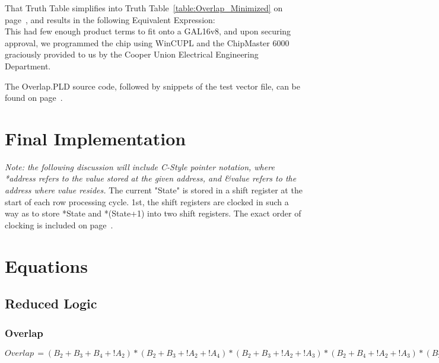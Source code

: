 \documentclass[letterpaper,titlepage,oneside]{article}
\begin{document}
That Truth Table simplifies into Truth Table~\ref{table:Overlap_Minimized} on page~\pageref{table:Overlap_Minimized}, and results in the following Equivalent Expression:\\[5pt]

This had few enough product terms to fit onto a GAL16v8, and upon securing approval, we programmed the chip using WinCUPL and the ChipMaster 6000 graciously provided to us by the Cooper Union Electrical Engineering Department.

The Overlap.PLD source code, followed by snippets of the test vector file, can be found on page~\pageref{code:Overlap}.

\clearpage

\section{Final Implementation}
\textit{Note: the following discussion will include C-Style pointer notation, where *address refers to the value stored at the given address, and \&value refers to the address where value resides.}
The current "State" is stored in a shift register at the start of each row processing cycle. 1st, the shift registers are clocked in such a way as to store *State and *(State+1) into two shift registers. The exact order of clocking is included on page~\pageref{table:Clock}.

\section{Equations}
\subsection{Reduced Logic}
\subsubsection{Overlap}
\begin{normalsize}
$Overlap\,=(B_{2}+B_{3}+B_{4}+!A_{2})*(B_{2}+B_{3}+!A_{2}+!A_{4})*(B_{2}+B_{3}+!A_{2}+!A_{3})*(B_{2}+B_{4}+!A_{2}+!A_{3})*(B_{2}+!A_{2}+!A_{3}+!A_{4})*(!B_{1}+A_{1})*(B_{1}+!A_{1}+!A_{2})*(!B_{2}+A_{1}+A_{2})*(B_{1}+B_{2}+!A_{1})*(B_{2}+!B_{3}+A_{2}+A_{3})*(!B_{2}+B_{3}+B_{4}+A_{2})**(!B_{2}+A_{2}+!A_{3}+!A_{4})*(!B_{2}+!B_{3}+!A_{2}+A_{3})*(B_{2}+!B_{3}+!B_{4}+A_{2}+A_{4})*(B_{2}+!B_{4}+A_{2}+A_{3}+A_{4})*(!B_{2}+B_{3}+A_{2}+!A_{3})*(!B_{2}+B_{3}+A_{2}+!A_{4})*(!B_{2}+B_{4}+A_{2}+!A_{3})*(!B_{2}+!B_{3}+!B_{4}+!A_{2}+A_{4})*(!B_{2}+!B_{4}+!A_{2}+A_{3}+A_{4})$
\end{normalsize}
\end{document}
